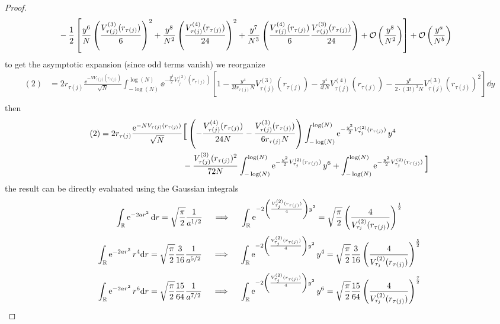 \begin{proof}
\begin{align}
	& - \frac{1}{2} \left[ \frac{y^6}{N} \left(\frac{V^{(3)}_{\tau(j)}(r_{\tau(j)})}{6} \right)^2 + \frac{y^8}{N^2} \left(\frac{V^{(4)}_{\tau(j)}(r_{\tau(j)})}{24} \right)^2 + \frac{y^7}{N^3} \left(\frac{V^{(4)}_{\tau(j)}(r_{\tau(j)})}{6} \frac{V^{(3)}_{\tau(j)}(r_{\tau(j)})}{24} \right) + \mathcal{O}\left(\frac{y^8}{N^2}\right)  \right] + \mathcal{O}\left(\frac{y^a}{N^b}\right)
\end{align}
to get the asymptotic expansion (since odd terms vanish) we reorganize
\begin{align}
	(2) & = 2 r_{\tau(j)} \frac{\ee^{-N V_{\tau(j)}(r_{\tau(j)})}}{\sqrt{N}}  \int_{-\log(N)}^{\log(N)} \ee^{-\frac{y^2}{2} V^{(2)}_{\tau_j}(r_{\tau(j)})}  \left[ 1 - \frac{y^4}{3! r_{\tau(j)} N} V^{(3)}_{\tau(j)}(r_{\tau(j)}) - \frac{y^4}{4! N} V^{(4)}_{\tau(j)}(r_{\tau(j)}) - \frac{y^6}{2 \cdot (3!)^2 N} V^{(3)}_{\tau(j)}(r_{\tau(j)})^2 \right] \dd y \\
\end{align}
then
\begin{align}
	(2) = 2 r_{\tau(j)} \frac{\ee^{-N V_{\tau(j)}(r_{\tau(j)})}}{\sqrt{N}} 
	& \scalebox{2}{[}
	\left(- \frac{V^{(4)}_{\tau(j)}(r_{\tau(j)})}{24 N} - \frac{V^{(3)}_{\tau(j)}(r_{\tau(j)})}{6 r_{\tau(j)} N} \right)
	\int_{-\log(N)}^{\log(N)} \ee^{-\frac{y^2}{2} V^{(2)}_{\tau_j}(r_{\tau(j)})} y^4 \\
	& - \frac{V^{(3)}_{\tau(j)}(r_{\tau(j)})^2}{72 N}
	\int_{-\log(N)}^{\log(N)} \ee^{-\frac{y^2}{2} V^{(2)}_{\tau_j}(r_{\tau(j)})} y^6 +
	\int_{-\log(N)}^{\log(N)} \ee^{-\frac{y^2}{2} V^{(2)}_{\tau_j}(r_{\tau(j)})} \scalebox{2}{]}
\end{align}
the result can be directly evaluated using the Gaussian integrals
\begin{equation}
	\int_{\mathbb{R}} \operatorname{e}^{-2ar^2} \mathrm{d} r = \sqrt{\frac{\pi}{2}} \frac{1}{a^{1/2}} \quad \implies \quad \int_{\mathbb{R}} \operatorname{e}^{- 2 \left( \frac{V^{(2)}_{\tau_j}(r_{\tau(j)})}{4} \right) y^2} = \sqrt{\frac{\pi}{2}} \left( \frac{4}{V^{(2)}_{\tau_j}(r_{\tau(j)})} \right)^{\frac{1}{2}}
\end{equation}
\begin{equation}
	\int_{\mathbb{R}} \operatorname{e}^{-2ar^2} r^4 \mathrm{d} r = \sqrt{\frac{\pi}{2}} \frac{3}{16} \frac{1}{a^{5/2}} \quad \implies \quad \int_{\mathbb{R}} \operatorname{e}^{- 2 \left( \frac{V^{(2)}_{\tau_j}(r_{\tau(j)})}{4} \right) y^2} y^4 = \sqrt{\frac{\pi}{2}} \frac{3}{16} \left(\frac{4}{V^{(2)}_{\tau_j}(r_{\tau(j)})} \right)^{\frac{5}{2}}
\end{equation}
\begin{equation}
	\int_{\R} \ee^{-2ar^2} r^6 \dd r = \sqrt{\frac{\pi}{2}} \frac{15}{64} \frac{1}{a^{7/2}} \quad \implies \quad \int_{\R}\ee^{- 2 \left( \frac{V^{(2)}_{\tau_j}(r_{\tau(j)})}{4} \right) y^2} y^6 = \sqrt{\frac{\pi}{2}} \frac{15}{64} \left( \frac{4}{V^{(2)}_{\tau_j}(r_{\tau(j)})} \right)^{\frac{7}{2}}

\end{equation}
\end{proof}
